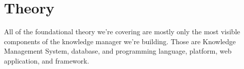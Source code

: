 \chapter{Theory}
\label{chap:theory}

All of the foundational theory we're covering are mostly only the most visible components of the knowledge manager we're building. Those are Knowledge Management System, database, and programming language, platform, web application, and framework.
